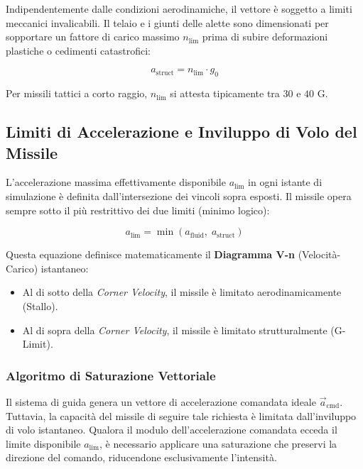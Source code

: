 \documentclass[12pt,a4paper]{article}
\begin{document}
Indipendentemente dalle condizioni aerodinamiche, il vettore è soggetto a limiti meccanici invalicabili. Il telaio e i giunti delle alette sono dimensionati per sopportare un fattore di carico massimo $n_{\text{lim}}$ prima di subire deformazioni plastiche o cedimenti catastrofici:

\begin{equation}
    a_{\text{struct}} = n_{\text{lim}} \cdot g_0
\end{equation}

Per missili tattici a corto raggio, $n_{\text{lim}}$ si attesta tipicamente tra $30$ e $40$ G.

\subsection{Limiti di Accelerazione e Inviluppo di Volo del Missile}

L'accelerazione massima effettivamente disponibile $a_{\text{lim}}$ in ogni istante di simulazione è definita dall'intersezione dei vincoli sopra esposti. Il missile opera sempre sotto il più restrittivo dei due limiti (minimo logico):

\begin{equation}
    a_{\text{lim}} = \min \left( a_{\text{fluid}}, \; a_{\text{struct}} \right)
\end{equation}

Questa equazione definisce matematicamente il \textbf{Diagramma V-n} (Velocità-Carico) istantaneo:
\begin{itemize}
    \item Al di sotto della \textit{Corner Velocity}, il missile è limitato aerodinamicamente (Stallo).
    \item Al di sopra della \textit{Corner Velocity}, il missile è limitato strutturalmente (G-Limit).
\end{itemize}

\subsubsection{Algoritmo di Saturazione Vettoriale}

Il sistema di guida genera un vettore di accelerazione comandata ideale
$\vec{a}_{\text{cmd}}$. Tuttavia, la capacità del missile di seguire tale richiesta è
limitata dall’inviluppo di volo istantaneo. Qualora il modulo
dell’accelerazione comandata ecceda il limite disponibile $a_{\text{lim}}$, è
necessario applicare una saturazione che preservi la direzione del comando,
riducendone esclusivamente l’intensità.
\end{document}
